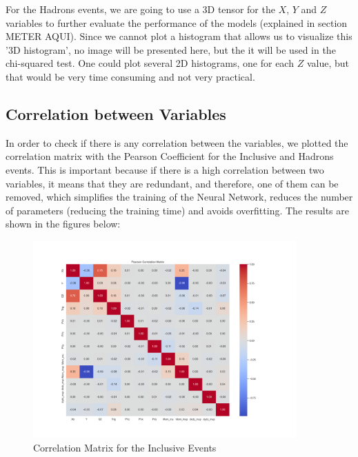\documentclass{article}
\begin{document}
For the Hadrons events, we are going to use a 3D tensor for the $X$, $Y$ and $Z$ variables to further evaluate the performance of the models (explained in section METER AQUI).
Since we cannot plot a histogram that allows us to visualize this '3D histogram', no image will be presented here, but the it will be used in the chi-squared test.
One could plot several 2D histograms, one for each $Z$ value, but that would be very time consuming and not very practical.


\subsection{Correlation between Variables}
In order to check if there is any correlation between the variables, we plotted the correlation matrix with the Pearson Coefficient for the Inclusive and Hadrons events.
This is important because if there is a high correlation between two variables, it means that they are redundant, and therefore, one of them can be removed, 
which simplifies the training of the Neural Network, reduces the number of parameters (reducing the training time) and avoids overfitting.
The results are shown in the figures below:

\begin{figure}[H]
    \centering
    \includegraphics[width=0.9\textwidth]{graphs/inclusive_correlation_matrix.png}
    \caption{Correlation Matrix for the Inclusive Events}
    \label{fig:inclusive_correlation_matrix}
\end{figure}
\end{document}
